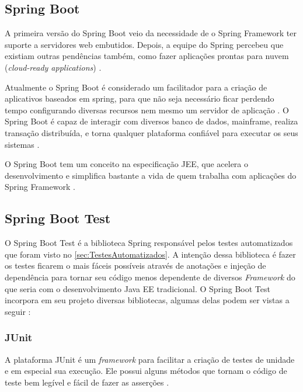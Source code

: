 \subsection{Spring Boot}\label{subsec:SpringBoot}

A primeira versão do Spring Boot veio da necessidade de o Spring Framework ter suporte a servidores web embutidos. Depois, a equipe do Spring percebeu que existiam outras pendências também, como fazer aplicações prontas para nuvem (\textit{cloud-ready applications}) \cite{Boagrio:2017}.

Atualmente o Spring Boot é considerado um facilitador para a criação de aplicativos baseados em spring, para que não seja necessário ficar perdendo tempo configurando diversas recursos nem mesmo um servidor de aplicação \cite{springBoot:2017}. O Spring Boot é capaz de interagir com diversos banco de dados, mainframe, realiza transação distribuída, e torna qualquer plataforma confiável para executar os seus sistemas \cite{Boagrio:2017}.

O Spring Boot tem um conceito na especificação JEE, que acelera o desenvolvimento e simplifica bastante a vida de quem trabalha com aplicações do Spring Framework \cite{Boagrio:2017}.

\subsection{Spring Boot Test}\label{subsec:SpringTest}

O Spring Boot Test é a biblioteca Spring responsável pelos testes automatizados que foram  visto no \autoref{sec:TestesAutomatizados}. A intenção dessa biblioteca é fazer os testes ficarem o mais fáceis possíveis através de anotações e injeção de dependência para tornar seu código menos dependente de diversos \textit{Framework} do que seria com o desenvolvimento Java EE tradicional. 
O Spring Boot Test incorpora em seu projeto diversas bibliotecas, algumas delas podem ser vistas a seguir \cite{springBootTest:2017}:

\subsubsection{JUnit}\label{subsec:JUnit}
	
	A plataforma JUnit é um \textit{framework} para facilitar a criação de testes de unidade e em especial sua execução. Ele possui alguns métodos que tornam o código de teste bem legível e fácil de fazer as asserções \cite{junit:2017}.

